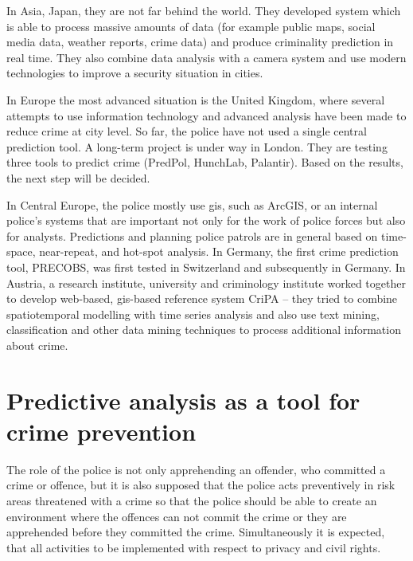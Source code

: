 \documentclass[thesis=M,english]{FITthesis}[2012/10/20]
\begin{document}
In Asia, Japan, they are not far behind the world. They developed system which is able to process massive amounts of data (for example public maps, social media data, weather reports, crime data) and produce criminality prediction in real time.\cite{hds} They also combine data analysis with a camera system and use modern technologies to improve a security situation in cities. 

In Europe the most advanced situation is the United Kingdom, where several attempts to use information technology and advanced analysis have been made to reduce crime at city level.\cite[286]{Hruska2015maps} So far, the police have not used a single central prediction tool. A long-term project is under way in London. They are testing three tools to predict crime (PredPol, HunchLab, Palantir). Based on the results, the next step will be decided. 

In Central Europe, the police mostly use \gls{gis}, such as ArcGIS, or an internal police's systems that are important not only for the work of police forces but also for analysts.\cite[286--289]{futuremaps} Predictions and planning police patrols are in general based on time-space, near-repeat, and hot-spot analysis. In Germany, the first crime prediction tool, PRECOBS, was first tested in Switzerland and subsequently in Germany. In Austria, a research institute, university and criminology institute worked together to develop web-based, \gls{gis}-based reference system CriPA -- they tried to combine spatiotemporal modelling with time series analysis and also use text mining, classification and other data mining techniques to process additional information about crime.\cite[214]{futuremaps} 


\chapter{Predictive analysis as a tool for crime prevention}\label{sec:prevention}

The role of the police is not only apprehending an offender, who committed a crime or offence, but it is also supposed that the police acts preventively in risk areas threatened with a crime so that the police should be able to create an environment where the offences can not commit the crime or they are apprehended before they committed the crime. Simultaneously it is expected, that all activities to be implemented with respect to privacy and civil rights. 
\end{document}
